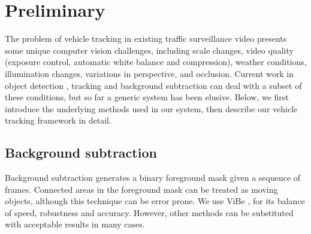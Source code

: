 \section{Preliminary}
\label{sec:tracker-preliminary}

The problem of vehicle tracking in existing traffic surveillance video presents some unique computer vision challenges, including scale changes, video quality (exposure control, automatic white balance and compression), weather conditions, illumination changes, variations in perspective, and occlusion.
Current work in object detection 
\cite{viola2001rapid,dalal2005histograms,felzenszwalb2010cascade,girshick2014rich}, 
tracking \cite{henriques2015high,hare2011struck,vojir2014robust}
and background subtraction \cite{barnich2011vibe,zivkovic2006efficient}
can deal with a subset of these conditions, but so far a generic system has been elusive. Below, we first introduce the underlying methods used in our system, then describe our vehicle tracking framework in detail. 


\subsection{Background subtraction}
Background subtraction generates a binary foreground mask given a sequence of frames. Connected areas in the foreground mask can be treated as moving objects, although this technique can be error prone. 
We use ViBe \cite{barnich2011vibe}, for its balance of speed, robustness and accuracy. However, other methods 
can be substituted with acceptable results in many cases.


